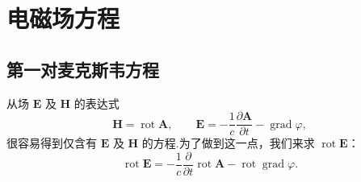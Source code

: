 \chapter{电磁场方程}

\section{第一对麦克斯韦方程}

从场 $\boldsymbol{E}$ 及 $\boldsymbol{H}$ 的表达式
\begin{equation*}
  \boldsymbol{H}=\operatorname{rot}\boldsymbol{A},\qquad
  \boldsymbol{E}=-\frac{1}{c}\frac{\partial\boldsymbol{A}}{\partial t}
  -\operatorname{grad}\varphi,
\end{equation*}
很容易得到仅含有 $\boldsymbol{E}$ 及 $\boldsymbol{H}$ 的方程.为了做到这一点，我们来求
$\operatorname{rot}\boldsymbol{E}$：
\begin{equation*}
  \operatorname{rot}\boldsymbol{E}
  =-\frac{1}{c}\frac{\partial}{\partial t}\operatorname{rot}\boldsymbol{A}
  -\operatorname{rot}\operatorname{grad}\varphi.
\end{equation*}

